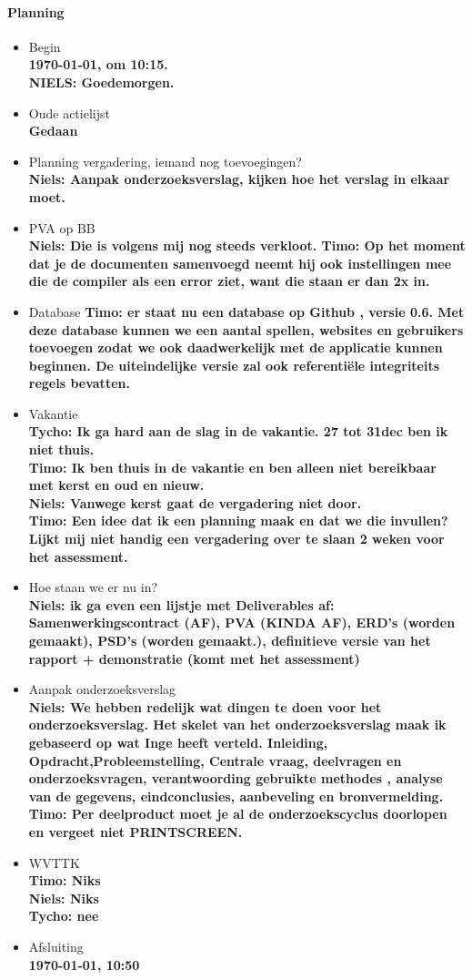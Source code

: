 \documentclass[11pt]{article}
\begin{document}
\paragraph{Planning}
\begin{itemize}
	\item Begin\\ \textbf{\today , om 10:15.\\
	NIELS: Goedemorgen.}
	\item Oude actielijst \\\textbf{Gedaan}
	\item Planning vergadering, iemand nog toevoegingen?\\
	\textbf{Niels: Aanpak onderzoeksverslag, kijken hoe het verslag in elkaar moet.}
	\item PVA op BB \\ \textbf{Niels: Die is volgens mij nog steeds verkloot.
	Timo: Op het moment dat je de documenten samenvoegd neemt hij ook instellingen mee die de compiler als een error ziet, want die staan er dan 2x in. }
	\item Database
	\textbf{Timo: er staat nu een database op Github , versie 0.6. Met deze database kunnen we een aantal spellen, websites en gebruikers toevoegen zodat we ook daadwerkelijk met de applicatie kunnen beginnen. De uiteindelijke versie zal ook referentiële integriteits regels bevatten.}
	\item Vakantie\\
	\textbf{Tycho: Ik ga hard aan de slag in de vakantie. 27 tot 31dec ben ik niet thuis.  \\ Timo: Ik ben thuis in de vakantie en ben alleen niet bereikbaar met kerst en oud en nieuw. \\ Niels: Vanwege kerst gaat de vergadering niet door.\\Timo: Een idee dat ik een planning maak en dat we die invullen? Lijkt mij niet handig een vergadering over te slaan 2 weken voor het assessment. }
	\item Hoe staan we er nu in? \\
	\textbf{Niels: ik ga even een lijstje met Deliverables af: Samenwerkingscontract (AF), PVA (KINDA AF), ERD's (worden gemaakt), PSD's (worden gemaakt.), definitieve versie van het rapport + demonstratie (komt met het assessment)}
	\item Aanpak onderzoeksverslag\\
	\textbf{Niels: We hebben redelijk wat dingen te doen voor het onderzoeksverslag. Het skelet van het onderzoeksverslag maak ik gebaseerd op wat Inge heeft verteld. Inleiding, Opdracht,Probleemstelling, Centrale vraag, deelvragen en onderzoeksvragen, verantwoording gebruikte methodes , analyse van de gegevens, eindconclusies, aanbeveling en bronvermelding.\\ Timo: Per deelproduct moet je al de onderzoekscyclus doorlopen en vergeet niet PRINTSCREEN.  }
	\item WVTTK \\
	\textbf{Timo: Niks\\
	Niels: Niks\\
	Tycho: nee}
    \item Afsluiting \\ \textbf{\today , 10:50}


\end{itemize}
\end{document}
